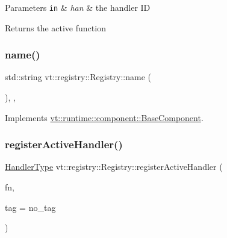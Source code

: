 \begin{DoxyParams}[1]{Parameters}
\mbox{\tt in}  & {\em han} & the handler ID\\
\hline
\end{DoxyParams}
\begin{DoxyReturn}{Returns}
the active function 
\end{DoxyReturn}
\mbox{\label{structvt_1_1registry_1_1_registry_a8488eb3ab95e207094617027bb5c75c9}} 
\subsubsection{\texorpdfstring{name()}{name()}}
{\footnotesize\ttfamily std\+::string vt\+::registry\+::\+Registry\+::name (\begin{DoxyParamCaption}{ }\end{DoxyParamCaption})\hspace{0.3cm}{\ttfamily [inline]}, {\ttfamily [override]}, {\ttfamily [virtual]}}



Implements \hyperlink{structvt_1_1runtime_1_1component_1_1_base_component_a7701485f3539f78d42e6bad47fc7eb78}{vt\+::runtime\+::component\+::\+Base\+Component}.

\mbox{\label{structvt_1_1registry_1_1_registry_ad4fdbf2cfbe4e852c5556435efe4255f}} 
\subsubsection{\texorpdfstring{register\+Active\+Handler()}{registerActiveHandler()}}
{\footnotesize\ttfamily \hyperlink{namespacevt_af64846b57dfcaf104da3ef6967917573}{Handler\+Type} vt\+::registry\+::\+Registry\+::register\+Active\+Handler (\begin{DoxyParamCaption}\item[{\hyperlink{namespacevt_a2a06c34cafcd511828f16cbf1476b924}{Active\+Closure\+Fn\+Type}}]{fn,  }\item[{\hyperlink{namespacevt_a84ab281dae04a52a4b243d6bf62d0e52}{Tag\+Type} const \&}]{tag = {\ttfamily no\+\_\+tag} }\end{DoxyParamCaption})}




